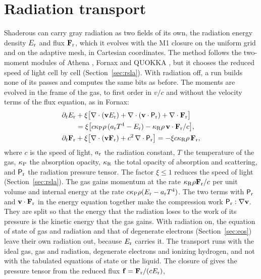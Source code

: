 \documentclass[twocolumn]{aastex701}
\begin{document}
\section{Radiation transport}
\label{sec:radiation}

Shaderous can carry gray radiation as two fields of its own, the radiation energy density $E_{\rm r}$ and flux $\mathbf{F}_{\rm r}$, which it evolves with the M1 closure on the uniform grid and on the adaptive mesh, in Cartesian coordinates. The method follows the two-moment modules of Athena \citep{Skinner2013}, Fornax \citep{Skinner2019} and QUOKKA \citep{Wibking2022}, but it chooses the reduced speed of light cell by cell (Section~\ref{sec:rsla}). With radiation off, a run builds none of its passes and computes the same bits as before. The moments are evolved in the frame of the gas, to first order in $v/c$ and without the velocity terms of the flux equation, as in Fornax:
\begin{equation}
\begin{aligned}
\partial_t E_{\rm r} &+ \xi\bigl[\nabla\cdot(\mathbf{v}E_{\rm r}) + \nabla\cdot(\mathbf{v}\cdot\mathsf{P}_{\rm r}) + \nabla\cdot\mathbf{F}_{\rm r}\bigr]\\
&= \xi\bigl[c\kappa_{\rm P}\rho\,(a_{\rm r}T^4 - E_{\rm r}) - \kappa_{\rm R}\rho\,\mathbf{v}\cdot\mathbf{F}_{\rm r}/c\bigr],\\
\partial_t \mathbf{F}_{\rm r} &+ \xi\bigl[\nabla\cdot(\mathbf{v}\mathbf{F}_{\rm r}) + c^2\,\nabla\cdot\mathsf{P}_{\rm r}\bigr] = -\xi c\kappa_{\rm R}\rho\,\mathbf{F}_{\rm r},
\end{aligned}
\label{eq:m1}
\end{equation}
where $c$ is the speed of light, $a_{\rm r}$ the radiation constant, $T$ the temperature of the gas, $\kappa_{\rm P}$ the absorption opacity, $\kappa_{\rm R}$ the total opacity of absorption and scattering, and $\mathsf{P}_{\rm r}$ the radiation pressure tensor. The factor $\xi \le 1$ reduces the speed of light (Section~\ref{sec:rsla}). The gas gains momentum at the rate $\kappa_{\rm R}\rho\mathbf{F}_{\rm r}/c$ per unit volume and internal energy at the rate $c\kappa_{\rm P}\rho(E_{\rm r} - a_{\rm r}T^4)$. The two terms with $\mathsf{P}_{\rm r}$ and $\mathbf{v}\cdot\mathbf{F}_{\rm r}$ in the energy equation together make the compression work $\mathsf{P}_{\rm r}:\nabla\mathbf{v}$. They are split so that the energy that the radiation loses to the work of its pressure is the kinetic energy that the gas gains. With radiation on, the equation of state of gas and radiation and that of degenerate electrons (Section~\ref{sec:eos}) leave their own radiation out, because $E_{\rm r}$ carries it. The transport runs with the ideal gas, gas and radiation, degenerate electrons and ionizing hydrogen, and not with the tabulated equations of state or the liquid. The closure of \citet{Levermore1984} gives the pressure tensor from the reduced flux $\mathbf{f} = \mathbf{F}_{\rm r}/(cE_{\rm r})$,
\end{document}
